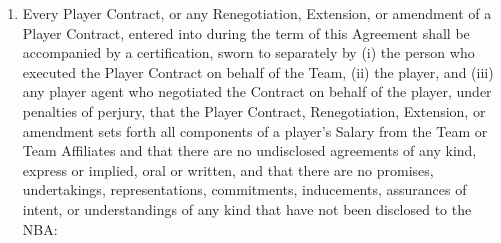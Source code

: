 \documentclass[
]{book}
\providecommand{\tightlist}{%
  \setlength{\itemsep}{0pt}\setlength{\parskip}{0pt}}
\begin{document}
\begin{enumerate}
\def\labelenumi{(\alph{enumi})}
\tightlist
\item
  Every Player Contract, or any Renegotiation, Extension, or amendment of a Player Contract, entered into during the term of this Agreement shall be accompanied by a certification, sworn to separately by (i) the person who executed the Player Contract on behalf of the Team, (ii) the player, and (iii) any player agent who negotiated the Contract on behalf of the player, under penalties of perjury, that the Player Contract, Renegotiation, Extension, or amendment sets forth all components of a player's Salary from the Team or Team Affiliates and that there are no undisclosed agreements of any kind, express or implied, oral or written, and that there are no promises, undertakings, representations, commitments, inducements, assurances of intent, or understandings of any kind that have not been disclosed to the NBA:


\end{enumerate}
\end{document}
